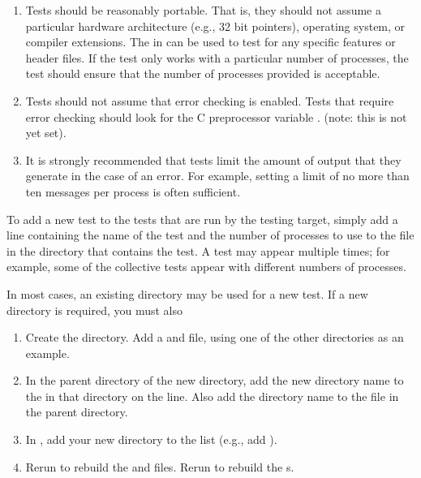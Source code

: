 \begin{enumerate}
\item Tests should be reasonably portable.  That is, they should not
assume a particular hardware architecture (e.g., 32 bit pointers),
operating system, or compiler extensions.  The  in
 can be used to test for any specific
features or header files.  If the test only works with a particular
number of processes, the test should ensure that the number of
processes provided is acceptable.  

\item Tests should not assume that error checking is enabled.  Tests
that require error checking should look for the C preprocessor
variable . (note: this is not yet set).

\item It is strongly recommended that tests limit the amount of output
that they generate in the case of an error.  For example, setting a
limit of no more than ten messages per process is often sufficient.  
\end{enumerate}

To add a new test to the tests that are run by the testing target,
simply add a line containing the name of the test and the number of
processes to use to the file  in the directory that
contains the test.  A test may appear multiple times; for example,
some of the collective tests appear with different numbers of
processes.

In most cases, an existing directory may be used for a new test.  If a
new directory is required, you must also 
\begin{enumerate}
\item Create the directory.  Add a  and
 file, using one of the other directories as an
example.
\item In the parent directory of the new directory, add the new
directory name to the  in that directory on the
 line.  Also add the directory name to the
 file in the parent directory.
\item In , add your new directory to the
 list (e.g., add ).
\item Rerun  to rebuild the 
and  files.  Rerun  to rebuild the
s.  
\end{enumerate}

